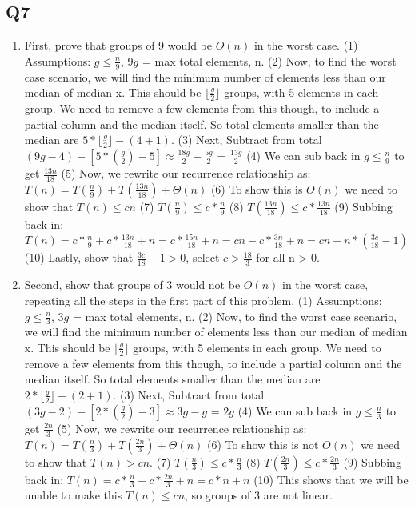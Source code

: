 \documentclass{article}
\newcommand\floor[1]{\lfloor#1\rfloor}
\begin{document}
\subsection*{Q7}
\begin{enumerate}[label=(\alph*)]
    \item First, prove that groups of 9 would be $O(n)$ in the worst case.
    \subitem (1) Assumptions: $ g \leq \frac{n}{9}$, $9g$ = max total elements, n.
    \subitem (2) Now, to find the worst case scenario, we will find the minimum number of elements less than our median of median x. This should be $\floor{\frac{g}{2}}$ groups, with 5 elements in each group. We need to remove a few elements from this though, to include a partial column and the median itself. So total elements smaller than the median are $5*\floor{\frac{g}{2}} - (4+1)$. 
    \subitem (3) Next, Subtract from total $(9g-4) - [5*(\frac{g}{2}) - 5] \approx \frac{18g}{2} - \frac{5g}{2}$ = $\frac{13g}{2}$
    \subitem (4) We can sub back in $ g \leq \frac{n}{9}$ to get $\frac{13n}{18}$
    \subitem (5) Now, we rewrite our recurrence relationship as: $T(n) = T(\frac{n}{9}) + T(\frac{13n}{18}) + \Theta(n)$
    \subitem (6) To show this is $O(n)$ we need to show that $T(n) \leq cn$
    \subitem (7) $T(\frac{n}{9}) \leq c*\frac{n}{9} $
    \subitem (8) $T(\frac{13n}{18}) \leq  c*\frac{13n}{18}$
    \subitem (9) Subbing back in: $T(n) = c*\frac{n}{9} + c*\frac{13n}{18} + n = c*\frac{15n}{18} + n = cn - c*\frac{3n}{18} + n = cn - n*(\frac{3c}{18}-1)$
    \subitem (10) Lastly, show that $\frac{3c}{18}-1 > 0$, select $c > \frac{18}{3}$ for all n > 0.

    \item Second, show that groups of 3 would not be $O(n)$ in the worst case, repeating all the steps in the first part of this problem.
    \subitem (1) Assumptions: $ g \leq \frac{n}{3}$, $3g$ = max total elements, n.
    \subitem (2) Now, to find the worst case scenario, we will find the minimum number of elements less than our median of median x. This should be $\floor{\frac{g}{2}}$ groups, with 5 elements in each group. We need to remove a few elements from this though, to include a partial column and the median itself. So total elements smaller than the median are $2*\floor{\frac{g}{2}} - (2+1)$. 
    \subitem (3) Next, Subtract from total $(3g-2) - [2*(\frac{g}{2}) - 3] \approx 3g - g$ = $2g$
    \subitem (4) We can sub back in $ g \leq \frac{n}{3}$ to get $\frac{2n}{3}$
    \subitem (5) Now, we rewrite our recurrence relationship as: $T(n) = T(\frac{n}{3}) + T(\frac{2n}{3}) + \Theta(n)$
    \subitem (6) To show this is not $O(n)$ we need to show that $T(n) > cn$.
    \subitem (7) $T(\frac{n}{3}) \leq c*\frac{n}{3} $
    \subitem (8) $T(\frac{2n}{3}) \leq  c*\frac{2n}{3}$
    \subitem (9) Subbing back in: $T(n) = c*\frac{n}{3} + c*\frac{2n}{3} + n = c*n + n$
    \subitem (10) This shows that we will be unable to make this $T(n) \leq cn$, so groups of 3 are not linear.
\end{enumerate}
\end{document}
